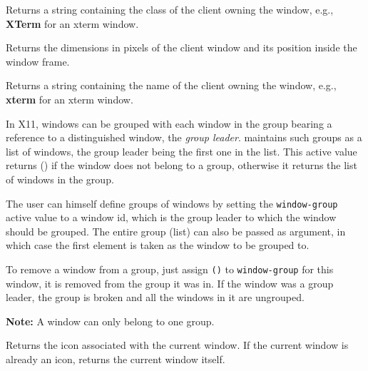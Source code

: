         

Returns a string containing the class of the client owning the window,
e.g., {\bf XTerm} for an xterm window.

        

Returns the dimensions in pixels of the client window and its position
inside the {\GWM} window frame.

        

Returns a string containing the name of the client owning the window, e.g.,
{\bf xterm} for an xterm window.

        

In X11, windows can be grouped with each window in the group bearing a
reference to a distinguished window, the {\em group leader}. {\GWM}
maintains such groups as a list of windows, the group leader being the first
one in the list. This active value returns () if the window does not belong
to a group, otherwise it returns 
the list of windows in the group.

The user can himself define groups of windows by setting the
\verb"window-group" active value to a window id, which is the group leader
to which the window should be grouped. The entire group (list) can also be
passed as argument, in which case the first element is taken as
the window to be grouped to.

To remove a window from a group, just assign \verb"()" to
\verb"window-group" for this window, it is removed from the group it
was in. If the window was a group leader, the group is broken and all
the windows in it are ungrouped.

{\bf Note:}  A window can only belong to one group.

        

Returns the icon associated with the current window. If the current window
is already an icon, returns the current window itself.

